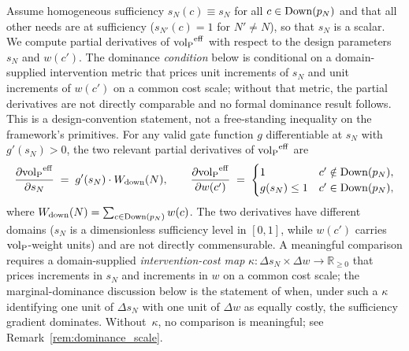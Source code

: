 \begin{proposition}
\label{prop:need_dominance}
Assume homogeneous sufficiency $s_N(c) \equiv s_N$ for all $c \in
\mathrm{Down}(p_N)$ and that all other needs are at sufficiency
($s_{N'}(c) = 1$ for $N' \neq N$), so that $s_N$ is a scalar.
We compute partial derivatives of ${\operatorname{vol}_{\mathrm{P}}}^{\mathrm{eff}}$
with respect to the design parameters $s_N$ and $w(c')$.
The dominance \emph{condition} below is conditional on a
domain-supplied intervention metric that prices unit
increments of $s_N$ and unit increments of $w(c')$ on a common
cost scale; without that metric, the partial derivatives are
not directly comparable and no formal dominance result
follows.  This is a design-convention statement, not a
free-standing inequality on the framework's primitives.
For any valid gate function $g$ differentiable at $s_N$ with
$g'(s_N) > 0$, the two relevant partial derivatives of
${\operatorname{vol}_{\mathrm{P}}}^{\mathrm{eff}}$ are
\[
  \frac{\partial {\operatorname{vol}_{\mathrm{P}}}^{\mathrm{eff}}}{\partial s_N}
  \;=\; g'(s_N) \cdot W_{\mathrm{down}}(N),
  \qquad
  \frac{\partial {\operatorname{vol}_{\mathrm{P}}}^{\mathrm{eff}}}{\partial w(c')}
  \;=\;
  \begin{cases}
    1 & c' \notin \mathrm{Down}(p_N), \\
    g(s_N) \leq 1 & c' \in \mathrm{Down}(p_N),
  \end{cases}
\]
where $W_{\mathrm{down}}(N) = \sum_{c \in \mathrm{Down}(p_N)} w(c)$.
The two derivatives have different domains ($s_N$ is a
dimensionless sufficiency level in $[0,1]$, while $w(c')$
carries ${\operatorname{vol}_{\mathrm{P}}}$-weight units) and are not directly
commensurable.  A meaningful comparison requires a
domain-supplied \emph{intervention-cost map}
$\kappa : \Delta s_N \times \Delta w \to \mathbb{R}_{\geq 0}$
that prices increments in $s_N$ and increments in $w$ on a
common cost scale; the marginal-dominance discussion below is
the statement of when, under such a $\kappa$ identifying one
unit of $\Delta s_N$ with one unit of $\Delta w$ as equally
costly, the sufficiency gradient dominates.  Without~$\kappa$,
no comparison is meaningful; see Remark~\ref{rem:dominance_scale}.


\end{proposition}
